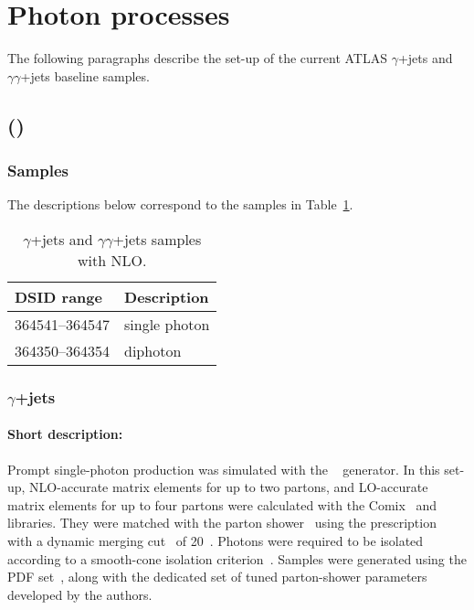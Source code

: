 \section{Photon processes}

The following paragraphs describe the set-up of the current ATLAS $\gamma$+jets and $\gamma\gamma$+jets baseline samples. 

\subsection[Sherpa (MEPS@NLO)]{\SHERPA (\MEPSatNLO)}

\subsubsection*{Samples}

The descriptions below correspond to the samples in Table~\ref{tab:gammajets-sherpa-nlo}.

\begin{table}[!htbp]
  \caption{$\gamma$+jets and $\gamma\gamma$+jets samples with \SHERPA NLO\@.}%
  \label{tab:gammajets-sherpa-nlo}
  \centering
  \begin{tabular}{l l}
    \toprule
    DSID range & Description \\
    \midrule
    364541--364547 & single photon \\ 
    364350--364354 & diphoton  \\
    \bottomrule
  \end{tabular}
\end{table}


\subsubsection{$\gamma$+jets}

\paragraph{Short description:}

Prompt single-photon production was simulated with the
\SHERPA[2.2]~\cite{Bothmann:2019yzt} generator. In this set-up, NLO-accurate
matrix elements for up to two partons, and LO-accurate matrix elements for up
to four partons were calculated with the Comix~\cite{Gleisberg:2008fv} and
\OPENLOOPS~\cite{Buccioni:2019sur,Cascioli:2011va,Denner:2016kdg} libraries. They were matched
with the \SHERPA parton shower~\cite{Schumann:2007mg} using the \MEPSatNLO
prescription~\cite{Hoeche:2011fd,Hoeche:2012yf,Catani:2001cc,Hoeche:2009rj}
with a dynamic merging cut~\cite{Siegert:2016bre} of 20~\GeV.
Photons were required to be isolated according to
a smooth-cone isolation criterion~\cite{Frixione:1998jh}. Samples were generated using the
\NNPDF[3.0nnlo] PDF set~\cite{Ball:2014uwa}, along with the dedicated set of
tuned parton-shower parameters developed by the \SHERPA authors.



